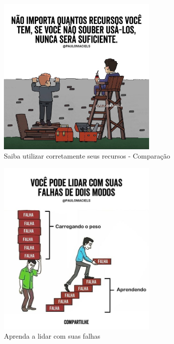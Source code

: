 \begin{figure}
    \centering
	\includegraphics[width=0.7\textwidth]{erros/uso_de_recursos_escada_2.jpg}
    \caption{Saiba utilizar corretamente seus recursos - Comparação}
    \label{fig:uso_recursos_escada_2}
\end{figure}




\begin{figure}
    \centering
	\includegraphics[width=0.7\textwidth]{erros/lidar_com_falhas.jpg}
    \caption{Aprenda a lidar com suas falhas}
    \label{fig:lidar_com_falhas}
\end{figure}

